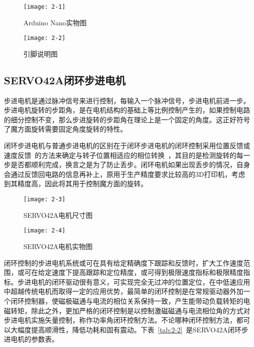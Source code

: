 \begin{figure}[H]
	\centering
	\texttt{[image: 2-1]}
	\caption{Arduino Nano实物图}\label{fig:2-1}
\end{figure}

\begin{figure}[H]
	\centering
	\texttt{[image: 2-2]}
	\caption{引脚说明图}\label{fig:2-2}
\end{figure}

\subsection{SERVO42A闭环步进电机}

步进电机是通过脉冲信号来进行控制，每输入一个脉冲信号，步进电机前进一步。步进电机旋转的步距角，是在电机结构的基础上等比例控制产生的，如果控制电路的细分控制不变，那么步进旋转的步距角在理论上是一个固定的角度。这正好符号了魔方面旋转需要固定角度旋转的特性。


闭环步进电机与普通步进电机的区别在于闭环步进电机的闭环控制采用位置反馈或速度反馈~\cite{26}的方法来确定与转子位置相适应的相位转换~\cite{27}，其目的是检测旋转的每一步是否都顺利完成，换言之是为了防止丢步。闭环电机如果出现丢步的情况，自身会通过反馈回电路的信息再补上，原用于生产精度要求比较高的3D打印机，考虑到其精度高，因此将其用于控制魔方面的旋转。

\begin{figure}[H]
	\centering
	\texttt{[image: 2-3]}
	\caption{SERVO42A电机尺寸图}\label{fig:2-3}
\end{figure}

\begin{figure}[H]
	\centering
	\texttt{[image: 2-4]}
	\caption{SERVO42A电机实物图}\label{fig:2-4}
\end{figure}

闭环控制的步进电机系统或可在具有给定精确度下跟踪和反馈时，扩大工作速度范围，或可在给定速度下提高跟踪和定位精度，或可得到极限速度指标和极限精度指标。步进电机的闭环驱动很有意义，可实现完全无过冲的位置定位，在中低速应用中超越传统电机而取得一定的应用优势，最简单的闭环控制是在常规驱动器外加一个闭环控制器，使磁极磁通与电流的相位关系保持一致，产生能带动负载转矩的电磁转矩，除此之外，更加严格的闭环控制是以控制激磁磁通与电流相位角的方式对步进电机实施矢量控制，称作功率角闭环控制方法。不论哪种闭环控制方法，都可以大幅度提高顺滑性，降低功耗和固有震动。下表~\ref{tab:2-2}~是SERVO42A闭环步进电机的参数表。

